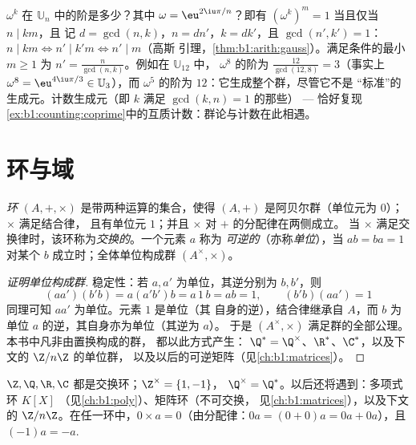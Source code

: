 \begin{example}\label{ex:b1:structures:orderU12}
$\omega^k$ 在 $\mathbb U_n$ 中的阶是多少？其中 $\omega =
\eu^{2\iu\pi/n}$？即有 $(\omega^k)^m = 1$ 当且仅当 $n \mid km$，且
记 $d = \gcd(n, k)$，$n = dn'$，$k = dk'$，且 $\gcd(n', k')
= 1$：$n \mid km \iff n' \mid k'm \iff n' \mid m$（高斯
引理，\cref{thm:b1:arith:gauss}）。满足条件的最小 $m \geq 1$ 为
$n' = \frac{n}{\gcd(n,k)}$。例如在 $\mathbb U_{12}$ 中，
$\omega^8$ 的阶为 $\frac{12}{\gcd(12,8)} = 3$（事实上
$\omega^8 = \eu^{4\iu\pi/3} \in \mathbb U_3$），而 $\omega^5$
的阶为 $12$：它生成整个群，尽管它不是
“标准”的生成元。计数生成元（即 $k$
满足 $\gcd(k, n) = 1$ 的那些） --- 恰好复现
\cref{ex:b1:counting:coprime}中的互质计数：群论与计数在此相遇。
\end{example}

\section{环与域}

\begin{definition}[环]\label{def:b1:structures:ring}
\emph{环} $(A, +, \times)$ 是带两种运算的集合，使得
$(A, +)$ 是阿贝尔群（单位元为 $0$）；$\times$ 满足结合律，
且有单位元 $1$；并且 $\times$ 对 $+$ 的分配律在两侧成立。
当 $\times$ 满足交换律时，该环称为\emph{交换的}。一个元素 $a$ 称为
\emph{可逆的}（亦称\emph{单位}），当 $ab = ba = 1$
对某个 $b$ 成立时；全体单位构成群 $(A^\times, \times)$。
\end{definition}

\begin{proof}[证明单位构成群]
稳定性：若 $a, a'$ 为单位，其逆分别为 $b, b'$，则
\[
(aa')(b'b) = a(a'b')b = a\,1\,b = ab = 1,
\qquad (b'b)(aa') = 1
\]
同理可知 $aa'$ 为单位。元素 $1$ 是单位（其
自身的逆），结合律继承自 $A$，而
$b$ 为单位 $a$ 的逆，其自身亦为单位（其逆为 $a$）。
于是 $(A^\times, \times)$ 满足群的全部公理。本书中凡非由置换构成的群，
都以此方式产生：
$\Q^* = \Q^\times$、$\R^*$、$\C^*$，以及下文的 $\Z/n\Z$ 的单位群，
以及以后的可逆矩阵（见\cref{ch:b1:matrices}）。
\end{proof}

\begin{example}\label{ex:b1:structures:rings}
$\Z, \Q, \R, \C$ 都是交换环；$\Z^\times = \{1, -1\}$，
$\Q^\times = \Q^*$。以后还将遇到：多项式环 $K[X]$
（见\cref{ch:b1:poly}）、矩阵环（不可交换，
见\cref{ch:b1:matrices}），以及下文的 $\Z/n\Z$。在任一环中，$0 \times
a = 0$（由分配律：$0a = (0+0)a = 0a + 0a$），且
$(-1)a = -a$.
\end{example}

